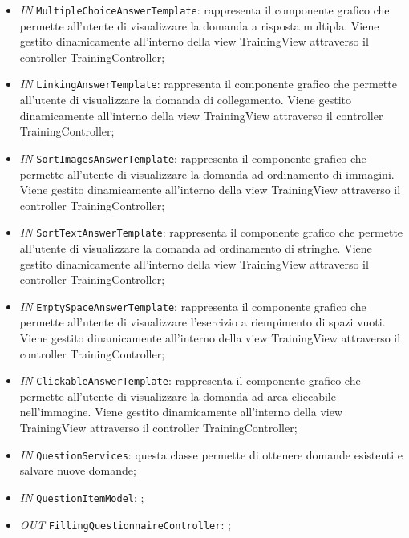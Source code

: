 \begin{itemize}
\begin{itemize}
\begin{itemize}
		\item \textit{IN} \texttt{MultipleChoiceAnswerTemplate}: rappresenta il componente grafico che permette all'utente di visualizzare la domanda a risposta multipla. Viene gestito dinamicamente all'interno della view TrainingView attraverso il controller TrainingController; 
		\item \textit{IN} \texttt{LinkingAnswerTemplate}: rappresenta il componente grafico che permette all'utente di visualizzare la domanda di collegamento. Viene gestito dinamicamente all'interno della view TrainingView attraverso il controller TrainingController; 
		\item \textit{IN} \texttt{SortImagesAnswerTemplate}: rappresenta il componente grafico che permette all'utente di visualizzare la domanda ad ordinamento di immagini. Viene gestito dinamicamente all'interno della view TrainingView attraverso il controller TrainingController; 
		\item \textit{IN} \texttt{SortTextAnswerTemplate}: rappresenta il componente grafico che permette all'utente di visualizzare la domanda ad ordinamento di stringhe. Viene gestito dinamicamente all'interno della view TrainingView attraverso il controller TrainingController; 
		\item \textit{IN} \texttt{EmptySpaceAnswerTemplate}: rappresenta il componente grafico che permette all'utente di visualizzare l'esercizio a riempimento di spazi vuoti. Viene gestito dinamicamente all'interno della view TrainingView attraverso il controller TrainingController; 
		\item \textit{IN} \texttt{ClickableAnswerTemplate}: rappresenta il componente grafico che permette all'utente di visualizzare la domanda ad area cliccabile nell'immagine. Viene gestito dinamicamente all'interno della view TrainingView attraverso il controller TrainingController;  
		\item \textit{IN} \texttt{QuestionServices}: questa classe permette di ottenere domande esistenti e salvare nuove domande;
		\item \textit{IN} \texttt{QuestionItemModel}: ;
		\item \textit{OUT} \texttt{FillingQuestionnaireController}: ;
		

\end{itemize}
\end{itemize}
\end{itemize}
